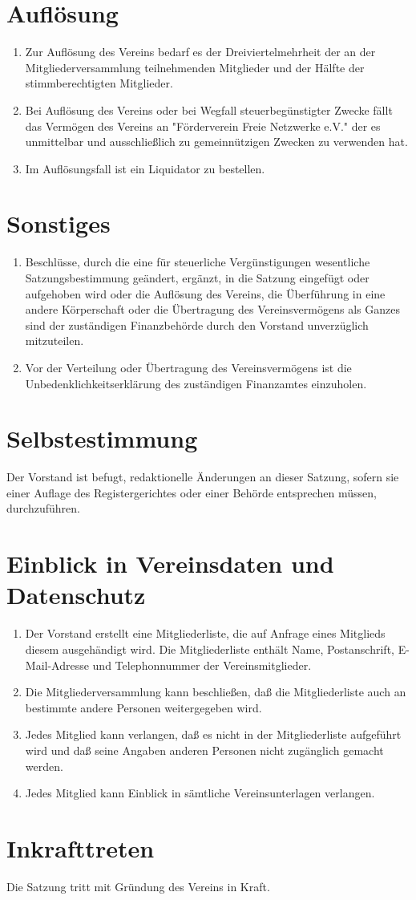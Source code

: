 \documentclass[ngerman]{article}
\begin{document}
\section{Auflösung}
\begin{enumerate}
  \item Zur Auflösung des Vereins bedarf es der Dreiviertelmehrheit der an der Mitgliederversammlung teilnehmenden Mitglieder und der Hälfte der stimmberechtigten Mitglieder.
  \item Bei Auflösung des Vereins oder bei Wegfall steuerbegünstigter Zwecke fällt das Vermögen des  Vereins an "Förderverein Freie Netzwerke e.V." der es unmittelbar und ausschließlich zu gemeinnützigen Zwecken zu verwenden hat.
  \item Im Auflösungsfall ist ein Liquidator zu bestellen.
\end{enumerate}

\section{Sonstiges}
\begin{enumerate}
  \item Beschlüsse, durch die eine für steuerliche Vergünstigungen wesentliche Satzungsbestimmung geändert, ergänzt, in die Satzung eingefügt oder aufgehoben wird oder die Auflösung des Vereins, die Überführung in eine andere Körperschaft oder die Übertragung des Vereinsvermögens als Ganzes sind der zuständigen Finanzbehörde durch den Vorstand unverzüglich mitzuteilen.
  \item Vor der Verteilung oder Übertragung des Vereinsvermögens ist die Unbedenklichkeitserklärung des zuständigen Finanzamtes einzuholen.
\end{enumerate}

\section{Selbstestimmung}
Der Vorstand ist befugt, redaktionelle Änderungen an dieser Satzung, sofern sie einer Auflage des Registergerichtes oder einer Behörde entsprechen müssen, durchzuführen.

\section{Einblick in Vereinsdaten und Datenschutz}
\begin{enumerate}
  \item Der Vorstand erstellt eine Mitgliederliste, die auf Anfrage eines Mitglieds diesem ausgehändigt wird.
  Die Mitgliederliste enthält Name, Postanschrift, E-Mail-Adresse und Telephonnummer der Vereinsmitglieder.
  \item Die Mitgliederversammlung kann beschließen, daß die Mitgliederliste auch an bestimmte andere Personen weitergegeben wird.
  \item Jedes Mitglied kann verlangen, daß es nicht in der Mitgliederliste aufgeführt wird und daß seine Angaben anderen Personen nicht zugänglich gemacht werden.
  \item Jedes Mitglied kann Einblick in sämtliche Vereinsunterlagen verlangen.
\end{enumerate}

\section{Inkrafttreten}

Die Satzung tritt mit Gründung des Vereins in Kraft.
\end{document}

